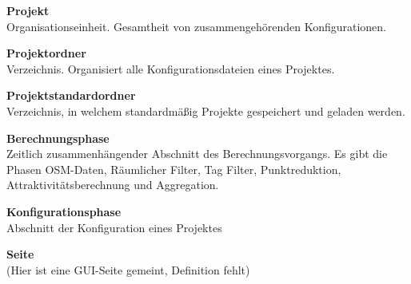 \documentclass[parskip=full]{scrartcl} %
\begin{document}
\textbf{Projekt}\\
Organisationseinheit. Gesamtheit von zusammengehörenden Konfigurationen.

\textbf{Projektordner}\\
Verzeichnis. Organisiert alle Konfigurationsdateien eines Projektes.

\textbf{Projektstandardordner}\\
Verzeichnis, in welchem standardmäßig Projekte gespeichert und geladen werden.

\textbf{Berechnungsphase}\\
Zeitlich zusammenhängender Abschnitt des Berechnungsvorgangs. Es gibt die Phasen OSM-Daten, Räumlicher Filter, Tag Filter, Punktreduktion, Attraktivitätsberechnung und Aggregation.

\textbf{Konfigurationsphase}\\
Abschnitt der Konfiguration eines Projektes

\textbf{Seite}\\
(Hier ist eine GUI-Seite gemeint, Definition fehlt)
\end{document}
